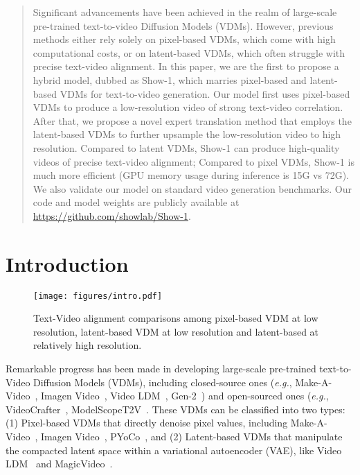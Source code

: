 \documentclass{article} \usepackage{iclr2024_conference,times}
\newcommand{\eg}{\textit{e.g.}}
\begin{document}
\begin{abstract}

Significant advancements have been achieved in the realm of large-scale pre-trained text-to-video Diffusion Models (VDMs). However, previous methods either rely solely on pixel-based VDMs, which come with high computational costs, or on latent-based VDMs, which often struggle with precise text-video alignment. In this paper, we are the first to propose a hybrid model, dubbed as Show-1, which marries pixel-based and latent-based VDMs for text-to-video generation. Our model first uses pixel-based VDMs to produce a low-resolution video of strong text-video correlation. After that, we propose a novel expert translation method that employs the latent-based VDMs to further upsample the low-resolution video to high resolution. Compared to latent VDMs, Show-1 can produce high-quality videos of precise text-video alignment; Compared to pixel VDMs, Show-1 is much more efficient  (GPU memory usage during inference is 15G vs 72G). We also validate our model on standard video generation benchmarks. Our code and model weights are publicly available at  \url{https://github.com/showlab/Show-1}.
\end{abstract}



\section{Introduction}



\begin{figure}[ht]
    \centering
    \texttt{[image: figures/intro.pdf]}
    \caption{Text-Video alignment comparisons among pixel-based VDM at low resolution, latent-based VDM at low resolution and latent-based at relatively high resolution.}
    \label{fig:intro}
\end{figure}


Remarkable progress has been made in developing large-scale pre-trained text-to-Video Diffusion Models (VDMs), including closed-source ones (\eg, Make-A-Video~\citep{singer2022make}, Imagen Video~\citep{ho2022imagen}, Video LDM~\citep{blattmann2023align}, Gen-2~\citep{esser2023structure}) and open-sourced ones (\eg, VideoCrafter~\citep{he2022latent}, ModelScopeT2V~\citep{wang2023modelscope}. 
These VDMs can be classified into two types: (1) Pixel-based VDMs that directly denoise pixel values, including Make-A-Video~\citep{singer2022make}, Imagen Video~\citep{ho2022imagen}, PYoCo~\citep{ge2023preserve}, and (2) Latent-based VDMs that manipulate the compacted latent space within a variational autoencoder (VAE), like Video LDM~\citep{blattmann2023align} and MagicVideo~\citep{zhou2022magicvideo}. 
\end{document}
